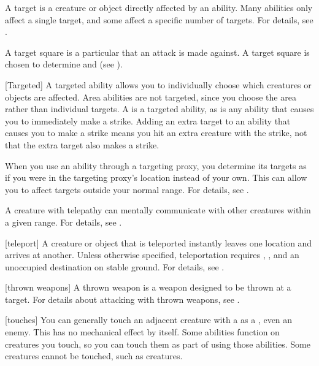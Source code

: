  A target is a creature or object directly affected by an ability.
Many abilities only affect a single target, and some affect a specific number of targets.
For details, see .

 A target square is a particular  that an attack is made against.
A target square is chosen to determine  and  (see ).

[Targeted] A targeted ability allows you to individually choose which creatures or objects are affected.
Area abilities are not targeted, since you choose the area rather than individual targets.
A  is a targeted ability, as is any ability that causes you to immediately make a strike.
Adding an extra target to an ability that causes you to make a strike means you hit an extra creature with the strike, not that the extra target also makes a strike.

 When you use an ability through a targeting proxy, you determine its targets as if you were in the targeting proxy's location instead of your own.
This can allow you to affect targets outside your normal range.
For details, see .

 A creature with telepathy can mentally communicate with other creatures within a given range.
For details, see .

[teleport] A creature or object that is teleported instantly leaves one location and arrives at another.
Unless otherwise specified, teleportation requires , , and an unoccupied destination on stable ground.
For details, see .

[thrown weapons] A thrown weapon is a weapon designed to be thrown at a target.
For details about attacking with thrown weapons, see .

[touches] You can generally touch an adjacent creature with a  as a , even an enemy.
This has no mechanical effect by itself.
Some abilities function on creatures you touch, so you can touch them as part of using those abilities.
Some creatures cannot be touched, such as  creatures.

